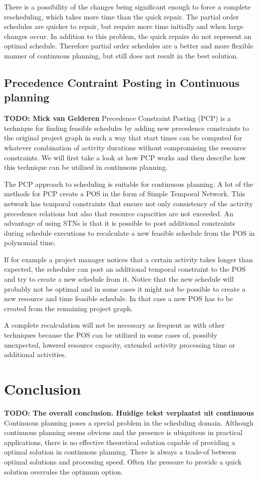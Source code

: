 \documentclass{article}
\newcommand{\TODO}[1]{{\color{red}\textbf{TODO: #1}}}
\begin{document}
There is a possibility of the changes being significant enough to force a complete rescheduling, which takes more time than the quick repair.
The partial order schedules are quicker to repair, but require more time initially and when large changes occur.
In addition to this problem, the quick repairs do not represent an optimal schedule.
Therefore partial order schedules are a better and more flexible manner of continuous planning, but still does not result in the best solution. 


\subsection{Precedence Contraint Posting in Continuous planning}
\TODO{Mick van Gelderen}
Precedence Constraint Posting (PCP) is a technique for finding feasible schedules by adding new precedence constraints to the original project graph in such a way that start times can be computed for whatever combination of activity durations without compromising the resource constraints. We will first take a look at how PCP works and then describe how this technique can be utilized in continuous planning. 

The PCP approach to scheduling is suitable for continuous planning. A lot of the methods for PCP create a POS in the form of Simple Temporal Network. This network has temporal constraints that ensure not only consistency of the activity precedence relations but also that resource capacities are not exceeded. An advantage of using STNs is that it is possible to post additional constraints during schedule executions to recalculate a new feasible schedule from the POS in polynomial time.

If for example a project manager notices that a certain activity takes longer than expected, the scheduler can post an additional temporal constraint to the POS and try to create a new schedule from it. Notice that the new schedule will probably not be optimal and in some cases it might not be possible to create a new resource and time feasible schedule. In that case a new POS has to be created from the remaining project graph. 

A complete recalculation will not be necessary as frequent as with other techniques because the POS can be utilized in some cases of, possibly unexpected, lowered resource capacity, extended activity processing time or additional activities. 

\newpage

\section{Conclusion}
\TODO{The overall conclusion. Huidige tekst verplaatst uit continuous}
Continuous planning poses a special problem in the scheduling domain.
Although continuous planning seems obvious and the presence is ubiquitous in practical applications, there is no effective theoretical solution capable of providing a optimal solution in continuous planning.
There is always a trade-of between optimal solutions and processing speed.
Often the pressure to provide a quick solution overrules the optimum option.

\newpage



\end{document}
